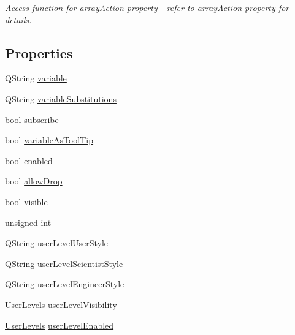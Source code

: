 \begin{DoxyCompactItemize}
\begin{DoxyCompactList}\small\item\em Access function for \hyperlink{classQERadioButton_aa9fcd012234b6ff09a5def4005afba53}{arrayAction} property -\/ refer to \hyperlink{classQERadioButton_aa9fcd012234b6ff09a5def4005afba53}{arrayAction} property for details. \end{DoxyCompactList}\end{DoxyCompactItemize}
\subsection*{Properties}
\begin{DoxyCompactItemize}
\item 
QString \hyperlink{classQERadioButton_a86f163446433bab555f21d69754ad309}{variable}
\item 
QString \hyperlink{classQERadioButton_ab2ed7b39ab32d1a5067d1c8e9fad850b}{variableSubstitutions}
\item 
bool \hyperlink{classQERadioButton_a7a75de07f11a61927d1442756f697345}{subscribe}
\item 
bool \hyperlink{classQERadioButton_affd89606cebad3bbe85a7ea394b004cb}{variableAsToolTip}
\item 
bool \hyperlink{classQERadioButton_a4d5d822fbcbc310e5e126aad54e49cdd}{enabled}
\item 
bool \hyperlink{classQERadioButton_a929608c74dad400185efa15f02b72bd9}{allowDrop}
\item 
bool \hyperlink{classQERadioButton_a44e1fad82f677ad4f6060cdefb488b4c}{visible}
\item 
unsigned \hyperlink{classQERadioButton_a5ce0f55c3e917bff62fab604ed962e29}{int}
\item 
QString \hyperlink{classQERadioButton_a89be5341593c73dd2b2dadfa2daf587e}{userLevelUserStyle}
\item 
QString \hyperlink{classQERadioButton_a1cc5aaa79764da34d130c4a7a8a1e2df}{userLevelScientistStyle}
\item 
QString \hyperlink{classQERadioButton_a6e05c0168077b53a67ef237eb5af1939}{userLevelEngineerStyle}
\item 
\hyperlink{classQERadioButton_abce53396b682b1c32d9909a34620cb50}{UserLevels} \hyperlink{classQERadioButton_a707c662aa4b125d0fc54c9eae4471a0d}{userLevelVisibility}
\item 
\hyperlink{classQERadioButton_abce53396b682b1c32d9909a34620cb50}{UserLevels} \hyperlink{classQERadioButton_ae020d45daeac4979a2b917159bba1c3f}{userLevelEnabled}

\end{DoxyCompactItemize}
